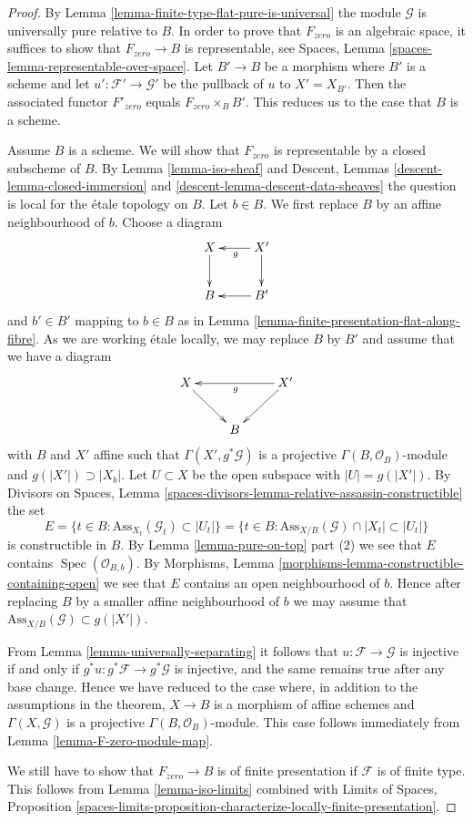 \documentclass[10pt,a4paper]{amsart}
\theoremstyle{plain}
\theoremstyle{definition}
\theoremstyle{remark}
\numberwithin{equation}{subsection}
\def\Spec{\mathop{\mathrm{Spec}}}
\begin{document}
\begin{proof}
By Lemma \ref{lemma-finite-type-flat-pure-is-universal}
the module $\mathcal{G}$ is universally pure relative to $B$.
In order to prove that $F_{zero}$ is an algebraic space,
it suffices to show that $F_{zero} \to B$ is representable, see
Spaces, Lemma \ref{spaces-lemma-representable-over-space}.
Let $B' \to B$ be a morphism where $B'$ is a scheme and let
$u' : \mathcal{F}' \to \mathcal{G}'$ be the pullback of $u$ to $X' = X_{B'}$.
Then the associated functor $F'_{zero}$ equals $F_{zero} \times_B B'$.
This reduces us to the case that $B$ is a scheme.

\medskip\noindent
Assume $B$ is a scheme. We will show that $F_{zero}$ is representable
by a closed subscheme of $B$. By Lemma \ref{lemma-iso-sheaf} and
Descent, Lemmas \ref{descent-lemma-closed-immersion} and
\ref{descent-lemma-descent-data-sheaves}
the question is local for the \'etale topology on $B$. Let $b \in B$.
We first replace $B$ by an affine neighbourhood of $b$.
Choose a diagram
$$
\xymatrix{
X \ar[d] & X' \ar[l]^g \ar[d] \\
B & B' \ar[l]
}
$$
and $b' \in B'$ mapping to $b \in B$
as in Lemma \ref{lemma-finite-presentation-flat-along-fibre}.
As we are working \'etale locally, we may replace
$B$ by $B'$ and assume that we have a diagram
$$
\xymatrix{
X \ar[rd] & & X' \ar[ll]^g \ar[ld] \\
& B
}
$$
with $B$ and $X'$ affine such that $\Gamma(X', g^*\mathcal{G})$
is a projective $\Gamma(B, \mathcal{O}_B)$-module and
$g(|X'|) \supset |X_b|$. Let $U \subset X$ be the open subspace
with $|U| = g(|X'|)$. By
Divisors on Spaces, Lemma
\ref{spaces-divisors-lemma-relative-assassin-constructible} the set
$$
E = \{t \in B : \text{Ass}_{X_t}(\mathcal{G}_t) \subset |U_t|\} =
\{t \in B : \text{Ass}_{X/B}(\mathcal{G}) \cap |X_t| \subset |U_t|\}
$$
is constructible in $B$. By Lemma \ref{lemma-pure-on-top} part (2)
we see that $E$ contains $\Spec(\mathcal{O}_{B, b})$. By
Morphisms, Lemma \ref{morphisms-lemma-constructible-containing-open}
we see that $E$ contains an open neighbourhood of $b$. Hence after
replacing $B$ by a smaller affine neighbourhood of $b$ we may assume that
$\text{Ass}_{X/B}(\mathcal{G}) \subset g(|X'|)$.

\medskip\noindent
From Lemma \ref{lemma-universally-separating}
it follows that $u : \mathcal{F} \to \mathcal{G}$ is injective if and only if
$g^*u : g^*\mathcal{F} \to g^*\mathcal{G}$ is injective, and the same remains
true after any base change. Hence we have reduced to the case where,
in addition to the assumptions in the theorem, $X \to B$ is a morphism of
affine schemes and $\Gamma(X, \mathcal{G})$ is a projective
$\Gamma(B, \mathcal{O}_B)$-module. This case follows immediately from
Lemma \ref{lemma-F-zero-module-map}.

\medskip\noindent
We still have to show that $F_{zero} \to B$ is of finite presentation if
$\mathcal{F}$ is of finite type. This follows from
Lemma \ref{lemma-iso-limits} combined with
Limits of Spaces, Proposition
\ref{spaces-limits-proposition-characterize-locally-finite-presentation}.
\end{proof}
\end{document}
